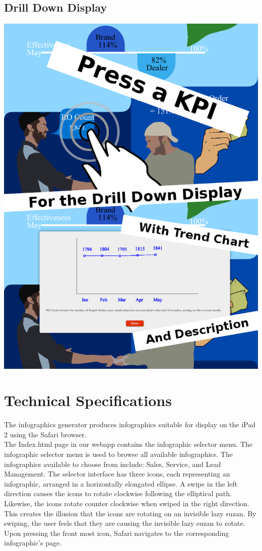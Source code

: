 \documentclass[11pt,a4paper,oneside]{article}
\begin{document}
\subsection{Drill Down Display}
\includegraphics[width=.6\textwidth]{images/fun.png}\\


\newpage

\section{Technical Specifications}

The infographics generator produces infographics suitable for display on the iPad 2 using the Safari browser.\\

The Index.html page in our webapp contains the infographic selector menu. The infographic selector menu is used to browse all available infographics. The infographics available to choose from include: Sales, Service, and Lead Management. The selector interface has three icons, each representing an infographic, arranged in a horizontally elongated ellipse. A swipe in the left direction causes the icons to rotate clockwise following the elliptical path. Likewise, the icons rotate counter clockwise when swiped in the right direction. This creates the illusion that the icons are rotating on an invisible lazy suzan. By swiping, the user feels that they are causing the invisible lazy suzan to rotate. Upon pressing the front most icon, Safari navigates to the corresponding infographic's page.\\
\end{document}
